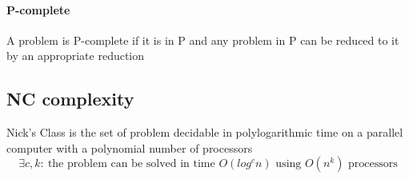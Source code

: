 \documentclass{article}
\begin{document}
\paragraph{P-complete} A problem is P-complete if it is in P and any problem in P can be reduced to it by an appropriate reduction

\subsection{NC complexity} Nick's Class is the set of problem decidable in polylogarithmic time on a parallel computer with a polynomial number of processors
\[
\exists c,k: \: \text{the problem can be solved in time }
O(log^c n)
\text{ using } O(n^k) \text{ processors}
\]
\end{document}
